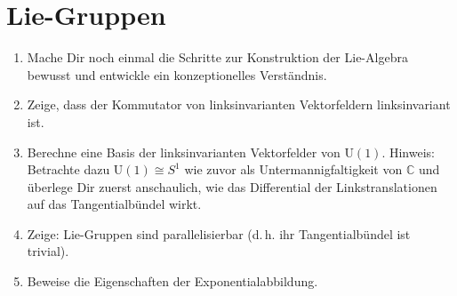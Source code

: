 \documentclass[a4paper]{scrartcl}
\begin{document}
	\section{Lie-Gruppen}
	\begin{enumerate}
		\item Mache Dir noch einmal die Schritte zur Konstruktion der Lie-Algebra bewusst und entwickle ein konzeptionelles Verständnis.
		\item Zeige, dass der Kommutator von linksinvarianten Vektorfeldern linksinvariant ist.
		\item Berechne eine Basis der linksinvarianten Vektorfelder von $\mathrm{U}(1)$. Hinweis: Betrachte dazu $\mathrm{U}(1)\cong S^1$ wie zuvor als Untermannigfaltigkeit von $\mathbb{C}$ und überlege Dir zuerst anschaulich, wie das Differential der Linkstranslationen auf das Tangentialbündel wirkt.
		\item Zeige: Lie-Gruppen sind parallelisierbar (d.\,h. ihr Tangentialbündel ist trivial).
		\item Beweise die Eigenschaften der Exponentialabbildung.
	\end{enumerate}
\end{document}
